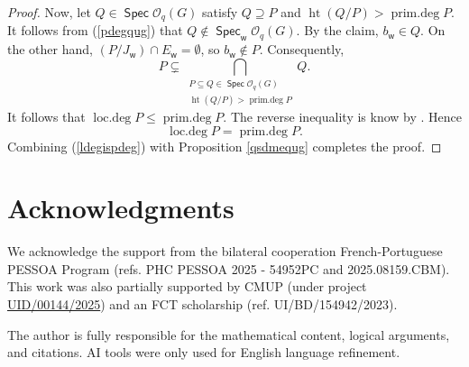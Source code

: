 \documentclass[11pt]{article}
\theoremstyle{definition}
\numberwithin{equation}{section}
\newcommand{\qu}{\mathcal{O}}
\DeclareMathOperator{\heit}{\mathrm{ht}}
\DeclareMathOperator{\pdeg}{\mathrm{prim.deg}}
\DeclareMathOperator{\ldeg}{\mathrm{loc.deg}}
\newcommand\w{\mathsf{w}}
\DeclareMathOperator{\spec}{\mathsf{Spec}}
\begin{document}
\begin{proof}
  		 
  		  Now, let $Q\in\spec\qu_q(G)$ satisfy $Q\supseteq P$ and $\heit (Q/P)> \pdeg P$. It follows from (\ref{pdegqug}) that  $Q\notin\spec_{\w}\qu_q(G)$. By the claim, $b_{\w}\in Q$. On the other hand, $(P/J_{\w})\cap E_{\w}= \emptyset$, so $b_{\w}\notin P$. Consequently, 
  		  $$P\subsetneq \bigcap_{\substack{P\subseteq Q\in\spec\qu_q(G)\\\heit(Q/P)> \pdeg P}}Q.$$
  		  It follows that $\ldeg P\leq\pdeg P$. The reverse inequality is know by \cite[Proposition 2.1]{BLN17}. Hence
  		   \begin{equation}\label{ldegispdeg}
  		  	\ldeg P=  \pdeg P.
  		  \end{equation}
  		   Combining (\ref{ldegispdeg}) with Proposition \ref{qsdmequg} completes the proof.
  	\end{proof}
  

\section*{Acknowledgments}

We acknowledge the support from the bilateral cooperation French-Portuguese PESSOA Program (refs. PHC PESSOA 2025 - 54952PC and 2025.08159.CBM). This work was also partially supported by CMUP (under project \href{https://doi.org/10.54499/UID/00144/2025}{UID/00144/2025}) and an FCT scholarship (ref. UI/BD/154942/2023).

The author is fully responsible for the mathematical content, logical arguments, and citations. AI tools were only used for English language refinement.






\end{document}
